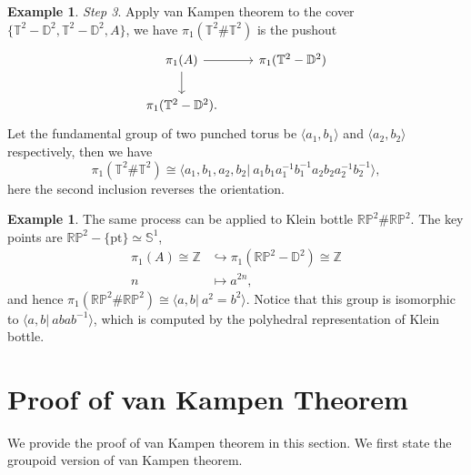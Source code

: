 \documentclass[a4paper]{amsart}
\theoremstyle{plain}
\theoremstyle{definition}
\newtheorem{eg}[thm]{Example}
\theoremstyle{remark}
\begin{document}
\begin{eg}
    \emph{Step 3}. Apply van Kampen theorem to the cover $\{\mathbb{T}^2-\mathbb{D}^2,\mathbb{T}^2-\mathbb{D}^2,A\}$, we have $\pi_1(\mathbb{T}^2\#\mathbb{T}^2)$ is the pushout
    \[\begin{tikzcd}
        \pi_1(A) \ar[r] \ar[d] & \pi_1(\mathbb{T}^2-\mathbb{D}^2)\\
        \pi_1(\mathbb{T}^2-\mathbb{D}^2). &
    \end{tikzcd}\]
    Let the fundamental group of two punched torus be $\langle a_1,b_1\rangle$ and $\langle a_2,b_2\rangle$ respectively, then we have
    \[\pi_1(\mathbb{T}^2\#\mathbb{T}^2)\cong\langle a_1,b_1,a_2,b_2|\ a_1b_1a_1^{-1}b_1^{-1}a_2b_2a_2^{-1}b_2^{-1}\rangle,\]
    here the second inclusion reverses the orientation.
\end{eg}

\begin{eg}
    The same process can be applied to Klein bottle $\mathbb{RP}^2\#\mathbb{RP}^2$.
    The key points are $\mathbb{RP}^2-\{\mathrm{pt}\}\simeq\mathbb{S}^1$,
    \begin{align*}
        \pi_1(A)\cong\mathbb{Z}&\hookrightarrow\pi_1(\mathbb{RP}^2-\mathbb{D}^2)\cong\mathbb{Z}\\
        n&\mapsto a^{2n},
    \end{align*}
    and hence $\pi_1(\mathbb{RP}^2\#\mathbb{RP}^2)\cong\langle a,b|\ a^2=b^2\rangle$.
    Notice that this group is isomorphic to $\langle a,b|\ abab^{-1}\rangle$, which is computed by the polyhedral representation of Klein bottle.
\end{eg}

\section{Proof of van Kampen Theorem}

We provide the proof of van Kampen theorem in this section.
We first state the groupoid version of van Kampen theorem.
\end{document}
